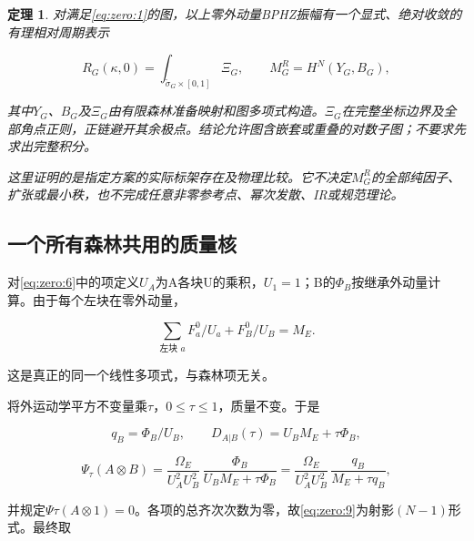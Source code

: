 \documentclass[11pt,a4paper,oneside]{ctexart}
\theoremstyle{cnplain}
\newtheorem{theorem}{定理}[section]
\theoremstyle{definition}
\theoremstyle{remark}
\numberwithin{equation}{section}
\begin{document}
\begin{theorem}

\label{thm:zero:1} 对满足\eqref{eq:zero:1}的图，以上零外动量BPHZ振幅有一个显式、绝对收敛的有理相对周期表示

\begin{equation}
R_G(\kappa,0)=\int_{\widetilde\sigma_G\times[0,1]}\Xi_G,
 \qquad M_G^R=H^N(Y_G,B_G),                                  \label{eq:zero:2}
\end{equation}

其中\(Y_G\)、\(B_G\)及\(\Xi _G\)由有限森林准备映射和图多项式构造。\(\Xi _G\)在完整坐标边界及全部角点正则，正链避开其余极点。结论允许图含嵌套或重叠的对数子图；不要求先求出完整积分。

这里证明的是指定方案的实际标架存在及物理比较。它不决定\(M_G^R\)的全部纯因子、扩张或最小秩，也不完成任意非零参考点、幂次发散、IR或规范理论。

\end{theorem}


\subsection{一个所有森林共用的质量核}\label{sec:zero:4}

对\eqref{eq:zero:6}中的项定义\(U_A\)为A各块U的乘积，\(U_1=1\)；B的\(\Phi _B\)按继承外动量计算。由于每个左块在零外动量，

\begin{equation}
\sum_{\text{左块 }a}F_a^0/U_a+F_B^0/U_B=M_E.                 \label{eq:zero:8}
\end{equation}

这是真正的同一个线性多项式，与森林项无关。

将外运动学平方不变量乘\(\tau \)，\(0\le \tau \le 1\)，质量不变。于是

\begin{equation}
q_B=\Phi_B/U_B,\qquad
 D_{A|B}(\tau)=U_BM_E+\tau\Phi_B,
\end{equation}

\begin{equation}
\Psi_\tau(A\otimes B)
  =\frac{\Omega_E}{U_A^2U_B^2}\,
              \frac{\Phi_B}{U_BM_E+\tau\Phi_B}
  =\frac{\Omega_E}{U_A^2U_B^2}\,
              \frac{q_B}{M_E+\tau q_B},                       \label{eq:zero:9}
\end{equation}

并规定\(\Psi \tau (A\otimes 1)=0\)。各项的总齐次次数为零，故\eqref{eq:zero:9}为射影\((N- 1)\)形式。最终取
\end{document}
